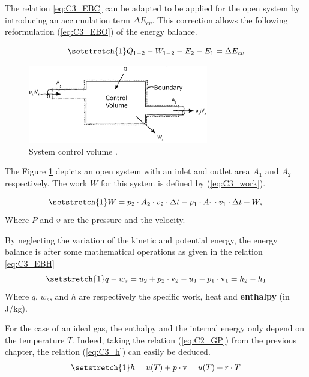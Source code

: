 The relation \ref{eq:C3_EBC} can be adapted to be applied for the open system by introducing an accumulation term $\Delta E_{cv}$. This correction allows the following reformulation (\ref{eq:C3_EBO}) of the energy balance.

\begin{equation}
\setstretch{1}
Q_{1-2} - W_{1-2} - E_{2} - E_{1} = \Delta E_{cv}\label{eq:C3_EBO}
\end{equation}
\begin{figure}[h]
\centering
\includegraphics[width=0.7\textwidth]{control_volume.png}
\caption{System control volume \cite{Dewallef2019}.}
\label{fig:C3_VC}
\end{figure}
The Figure \ref{fig:C3_VC} depicts an open system with an inlet and outlet area $A_1$ and $A_2$ respectively. The work $W$ for this system is defined by (\ref{eq:C3_work}).

\begin{equation}
\setstretch{1}
W = p_2\cdot A_2\cdot v_2\cdot \Delta t - p_1\cdot A_1\cdot v_1\cdot \Delta t + W_s \label{eq:C3_work}
\end{equation}      
Where $P$ and $v$ are the pressure and the velocity.

By neglecting the variation of the kinetic and potential energy, the energy balance is after some mathematical operations as given in the relation \ref{eq:C3_EBH}
\begin{equation}
\setstretch{1}
q - w_s = u_2 +p_2\cdot \mathrm{v}_2 - u_1 - p_1\cdot \mathrm{v}_1 = h_2 - h_1\label{eq:C3_EBH}
\end{equation}
Where $q$, $w_s$, and $h$ are respectively the specific work, heat and \textbf{enthalpy} (in J/kg).  

For the case of an ideal gas, the enthalpy and the internal energy only depend on the temperature $T$. Indeed, taking the relation (\ref{eq:C2_GP}) from the previous chapter, the relation (\ref{eq:C3_h}) can easily be deduced.
\begin{equation}
\setstretch{1}
h = u(T) + p\cdot \mathrm{v} = u(T) + r\cdot T \label{eq:C3_h}
\end{equation}

